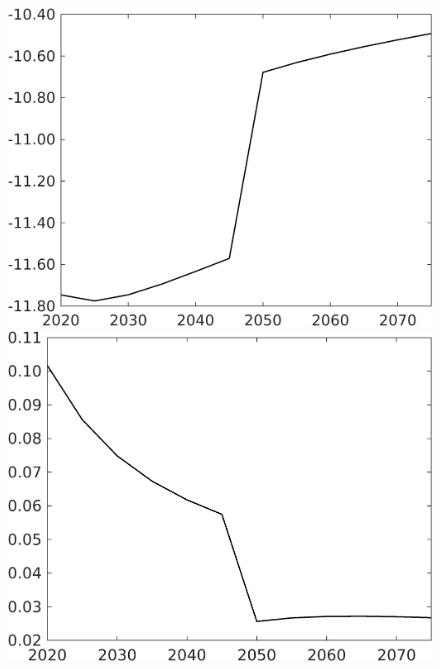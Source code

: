 \documentclass[12pt]{article}
\begin{document}
\begin{figure}[h!!]
\begin{minipage}[]{0.32\textwidth}
	\end{minipage}			
	\begin{minipage}[]{0.32\textwidth}
		\includegraphics[width=1\textwidth]{../../codding_model/own_basedOnFried/optimalPol_010922_revision/figures/all_13Sept22/CompTaufPER_bytaul_Equlab_Reg0_GFF_spillover0_nsk0_xgr0_knspil0_sep0_LFlimit1_emsbase0_countec0_GovRev0_etaa0.79_lgd0.png}
	\end{minipage}		
	\begin{minipage}[]{0.32\textwidth}
		\includegraphics[width=1\textwidth]{../../codding_model/own_basedOnFried/optimalPol_010922_revision/figures/all_13Sept22/CompTaufPER_bytaul_Equlab_Reg0_EY_spillover0_nsk0_xgr0_knspil0_sep0_LFlimit1_emsbase0_countec0_GovRev0_etaa0.79_lgd0.png}
	\end{minipage}	
\end{figure}
\end{document}
